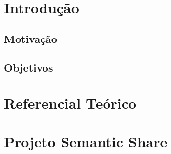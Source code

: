 \documentclass[a4paper]{abnt}
\begin{document}


\pagestyle{plain}
\tableofcontents
\listoffigures
\listoftables

%















\setcounter{page}{1}


\chapter{Introdução}
\label{cha:introducao}
    

\section{Motivação}
\label{cha:motivacao}
	

\section{Objetivos}
\label{cha:objetivos}
	

\chapter{Referencial Teórico}
\label{cha:referencial_teorico}
	

\chapter{Projeto Semantic Share}
\label{cha:proj_semantic}
	
\end{document}
